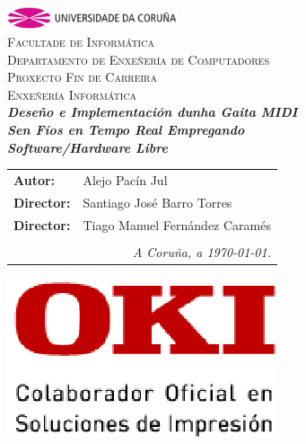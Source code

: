 \begin{titlepage}
\begin{center}
\includegraphics[width=5cm]{imagenes/anagramaUDC.png}\\[0.5cm]
{\textsc{Facultade de Informática}} \\
{\large \textsc{Departamento de Enxeñería de Computadores}} \\[1cm]
{\Large \textsc{Proxecto Fin de Carreira}} \\
{\Large \textsc{Enxeñería Informática}} \\[2cm]
{\Large \textsl{\textbf{Deseño e Implementación dunha Gaita MIDI}}} \\[0.15cm]
{\Large \textsl{\textbf{Sen Fíos en Tempo Real Empregando}}} \\
{\Large \textsl{\textbf{Software/Hardware Libre}}} \\
\vfill
\begin{flushright}
\begin{tabular}{ll}
\textbf{Autor:}    & Alejo Pacín Jul \\
\textbf{Director:} & Santiago José Barro Torres \\
\textbf{Director:} & Tiago Manuel Fernández Caramés \\
& \\
\multicolumn{2}{r}{\small \emph{A Coruña, a \today{}.}} \\
\end{tabular}
\end{flushright}
\begin{flushleft}
 \includegraphics[scale=0.4,keepaspectratio=true]{./imagenes/oki.png}
\end{flushleft}
\end{center}
\end{titlepage}
